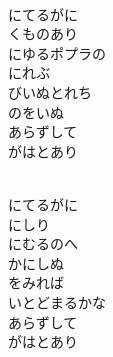 \documentclass[10pt,b5j]{tarticle} %
\begin{document}
\begin{enumerate}
\begin{minipage}[c]{\blocksize}
        \vspace{\linespace}
        \item~\\
        にてるがに\\
        くものあり\\
        にゆるポプラの\\
        にれぶ\\
        びいぬとれち\\
        のをいぬ\\
        あらずして\\
        がはとあり
        
        \vspace{\linespace}
        \item~\\
        にてるがに\\
        にしり\\
        にむるのへ\\
        かにしぬ\\
        をみれば\\
        いとどまるかな\\
        あらずして\\
        がはとあり
    
    \end{minipage}
\end{enumerate} %
\end{document}
